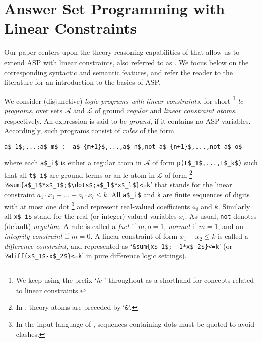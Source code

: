 
\section{Answer Set Programming with Linear Constraints}\label{sec:background}

Our paper centers upon the theory reasoning capabilities of \clingo{} that allow us to extend ASP with linear constraints,
also referred to as .
We focus below on the corresponding syntactic and semantic features, 
and refer the reader to the literature for an introduction to the basics of ASP. 

We consider (disjunctive) \emph{logic programs with linear constraints}, for short%
\footnote{We keep using the prefix `\emph{lc-}' throughout as a shorthand for concepts related to linear constraints.}
\emph{lc-programs},
over sets $\mathcal{A}$ and $\mathcal{L}$ of ground \emph{regular} and \emph{linear constraint atoms},
respectively.
%
An expression is said to be \emph{ground}, if it contains no ASP variables.
%
Accordingly, such programs consist of \emph{rules} of the form
\begin{lstlisting}[mathescape,numbers=none]
   a$_1$;...;a$_m$ :- a$_{m+1}$,...,a$_n$,not a$_{n+1}$,...,not a$_o$
\end{lstlisting}
where each \lstinline[mathescape]{a$_i$} is either 
a {regular atom} in $\mathcal{A}$ of form \lstinline[mathescape]{p(t$_1$,...,t$_k$)}
such that all \lstinline[mathescape]{t$_i$} are ground terms
or 
an {lc-atom} in $\mathcal{L}$ of form%
\footnote{In \clingo, theory atoms are preceded by `\texttt{\&}'.}
`\lstinline[mathescape]@&sum{a$_1$*x$_1$;$\dots$;a$_l$*x$_l$}<=k@' 
that stands for the linear constraint
\(
a_1\cdot x_1+\dots+a_l\cdot x_l\leq k
\).
All \lstinline[mathescape]{a$_i$} and \lstinline[mathescape]{k} are finite sequences of digits with at most one dot%
\footnote{In the input language of \clingo, sequences containing dots must be quoted to avoid clashes.} 
and represent real-valued coefficients $a_i$ and $k$.
Similarly all \lstinline[mathescape]{x$_i$} stand for the real (or integer) valued variables $x_i$.
%
As usual, \lstinline[mathescape]{not} denotes (default) \emph{negation}.
A rule is called a \emph{fact} if ${m,o}=1$,
\emph{normal} if $m=1$, and 
an \emph{integrity constraint} if $m=0$.
%
A linear constraint of form
\(
x_1-x_2\leq k
\)
is called a \emph{difference constraint},
and represented as
`\lstinline[mathescape]@&sum{x$_1$; -1*x$_2$}<=k@'
(or `\lstinline[mathescape]@&diff{x$_1$-x$_2$}<=k@' in pure difference logic settings). 

